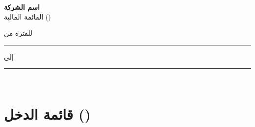 \documentclass[11pt,a4paper]{article}
\begin{document}
\begin{center}
{\LARGE\bfseries\color{accentColor} اسم الشركة}\\[0.3em]
{\large القائمة المالية ()}\\[0.3em]
{\normalsize للفترة من \rule{2.5cm}{0.4pt} إلى \rule{2.5cm}{0.4pt}} %
\\[1em]
\end{center}

\vspace{0.5em}

\section*{قائمة الدخل ()}
\end{document}
